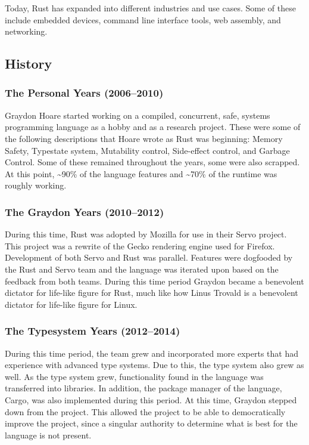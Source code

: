 \documentclass{article}
\begin{document}
  Today, Rust has expanded into different industries and use cases. Some of
  these include embedded devices, command line interface tools, web assembly,
  and networking.

  \subsection{History}
  \subsubsection{The Personal Years (2006--2010)}
  Graydon Hoare started working on a compiled, concurrent, safe, systems
  programming language as a hobby and as a research project. These were some of
  the following descriptions that Hoare wrote as Rust was beginning: Memory
  Safety, Typestate system, Mutability control, Side-effect control, and Garbage
  Control. Some of these remained throughout the years, some were also scrapped.
  At this point, \textasciitilde90\% of the language features and
  \textasciitilde70\% of the runtime was roughly working.

  \subsubsection{The Graydon Years (2010--2012)}
  During this time, Rust was adopted by Mozilla for use in their Servo project.
  This project was a rewrite of the Gecko rendering engine used for Firefox.
  Development of both Servo and Rust was parallel. Features were dogfooded by
  the Rust and Servo team and the language was iterated upon based on the
  feedback from both teams. During this time period Graydon became a benevolent
  dictator for life-like figure for Rust, much like how Linus Trovald is a
  benevolent dictator for life-like figure for Linux.

  \subsubsection{The Typesystem Years (2012--2014)}
  During this time period, the team grew and incorporated more experts that had
  experience with advanced type systems. Due to this, the type system also grew
  as well. As the type system grew, functionality found in the language was
  transferred into libraries. In addition, the package manager of the language,
  Cargo, was also implemented during this period. At this time, Graydon stepped
  down from the project. This allowed the project to be able to democratically
  improve the project, since a singular authority to determine what is best for
  the language is not present.
\end{document}
